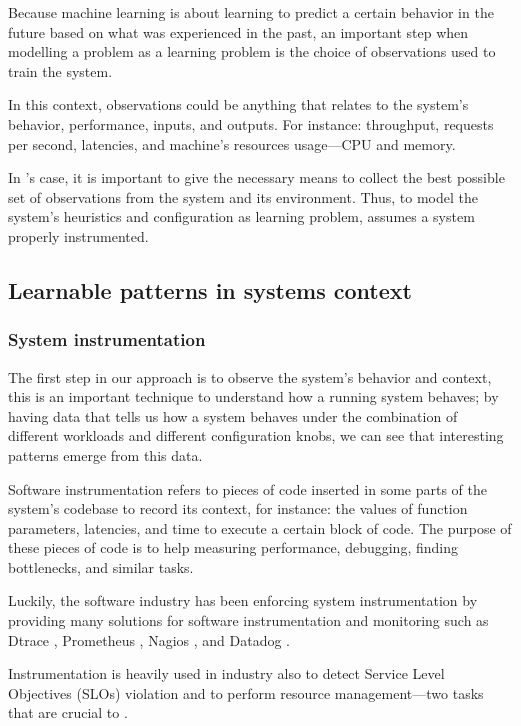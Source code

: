 Because machine learning is about learning to predict a certain behavior in the future based on what was experienced in the past, an important step when modelling a problem as a learning problem is the choice of observations used to train the system.

In this context, observations could be anything that relates to the system's behavior, performance, inputs, and outputs. For instance: throughput, requests per second, latencies, and machine's resources usage---CPU and memory.

In \projectname{}'s case, it is important to give the necessary means to collect the best possible set of observations from the system and its environment. Thus, to model the system's heuristics and configuration as learning problem, \projectname{} assumes a system properly instrumented.

\subsection{Learnable patterns in systems context}

\subsubsection{System instrumentation}

The first step in our approach is to observe the system's behavior and context, this is an important technique to understand how a running system behaves; by having data that tells us how a system behaves under the combination of different workloads and different configuration knobs, we can see that interesting patterns emerge from this data.

Software instrumentation refers to pieces of code inserted in some parts of the system's codebase to record its context, for instance: the values of function parameters, latencies, and time to execute a certain block of code. The purpose of these pieces of code is to help measuring performance, debugging, finding bottlenecks, and similar tasks.

Luckily, the software industry has been enforcing system instrumentation by providing many solutions for software instrumentation and monitoring such as Dtrace \cite{cantrill_dynamic_2004}, Prometheus \cite{Prometheus}, Nagios \cite{Nagios}, and Datadog \cite{Datadog}.

Instrumentation is heavily used in industry also to detect Service Level Objectives (SLOs) violation and to perform resource management---two tasks that are crucial to \projectname{}.

